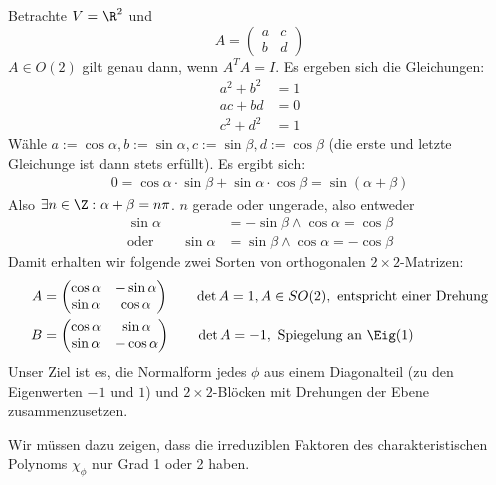 \documentclass{mycourse}
\begin{document}
Betrachte $V=\R^2$ und
\[
	A = \begin{pmatrix}a&c\\b&d\end{pmatrix}
\]
$A\in O(2)$ gilt genau dann, wenn $A^TA = I$.
Es ergeben sich die Gleichungen:
\begin{align*}
	a^2 + b^2 &= 1\\
	ac + bd &= 0\\
	c^2 + d^2 &= 1
\end{align*}
Wähle $a:=\cos \alpha, b:=\sin \alpha, c:= \sin \beta, d:= \cos \beta$ (die erste und letzte Gleichunge ist dann stets erfüllt).
Es ergibt sich:
\begin{align*}
	0 = \cos \alpha \cdot \sin \beta + \sin \alpha \cdot \cos \beta = \sin(\alpha + \beta)
\end{align*}
Also $\exists n\in \Z : \alpha + \beta = n\pi$.
$n$ gerade oder ungerade, also entweder
\begin{align*}
	\sin \alpha &= - \sin \beta \land \cos \alpha = \cos \beta\\
	\text{oder} \qquad \sin \alpha &= \sin \beta \land \cos \alpha = -\cos \beta
\end{align*}
Damit erhalten wir folgende zwei Sorten von orthogonalen $2\times 2$-Matrizen:
\begin{align*}
A &= \begin{pmatrix}\cos \alpha & -\sin \alpha \\ \sin \alpha & \cos \alpha \end{pmatrix} \qquad \det A = 1, A \in SO(2), \text{ entspricht einer Drehung} \\
B &= \begin{pmatrix}\cos \alpha & \sin \alpha \\ \sin \alpha & -\cos \alpha \end{pmatrix} \qquad \det A = -1,  \text{ Spiegelung an $\Eig(1)$} 
\end{align*}
Unser Ziel ist es, die Normalform jedes $\phi$ aus einem Diagonalteil (zu den Eigenwerten $-1$ und $1$) und $2\times 2$-Blöcken mit Drehungen der Ebene zusammenzusetzen.

Wir müssen dazu zeigen, dass die irreduziblen Faktoren des charakteristischen Polynoms $\chi_\phi$ nur Grad 1 oder 2 haben.
\end{document}
